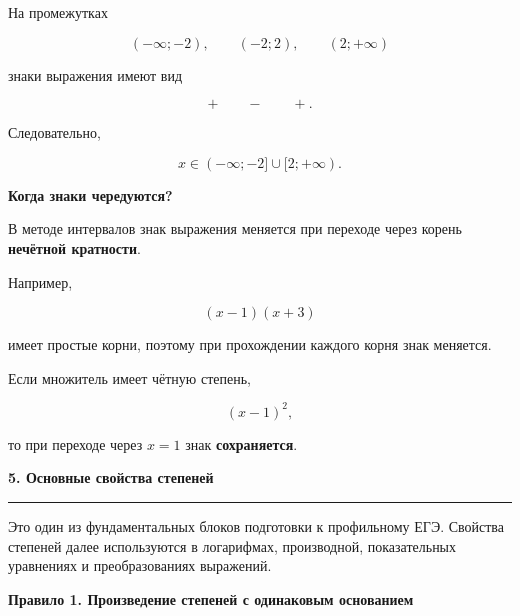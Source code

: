 \documentclass[a4paper,12pt]{article}
\newcommand{\MainSection}[1]{%
  \vspace{0.7em}
  {\Large\bfseries\color{darkaccent}#1\par}
  \vspace{0.25em}
  {\color{accent}\rule{\linewidth}{0.6pt}}
  \vspace{0.5em}
}
\newcommand{\SubSection}[1]{%
  \vspace{0.5em}
  {\large\bfseries\color{accent}#1\par}
  \vspace{0.2em}
}
\newcommand{\important}[1]{\textbf{\color{darkaccent}#1}}
\begin{document}
На промежутках

\[
(-\infty;-2),\qquad
(-2;2),\qquad
(2;+\infty)
\]

знаки выражения имеют вид

\[
+\qquad -\qquad +.
\]

Следовательно,

\[
\boxed{
x\in(-\infty;-2]\cup[2;+\infty)
}.
\]

\begin{center}
\end{center}

\SubSection{Когда знаки чередуются?}

В методе интервалов знак выражения меняется при переходе через корень
\important{нечётной кратности}.

Например,

\[
(x-1)(x+3)
\]

имеет простые корни, поэтому при прохождении каждого корня знак меняется.

Если множитель имеет чётную степень,

\[
(x-1)^2,
\]

то при переходе через \(x=1\) знак \important{сохраняется}.


\MainSection{5. Основные свойства степеней}

Это один из фундаментальных блоков подготовки к профильному ЕГЭ.
Свойства степеней далее используются в логарифмах, производной,
показательных уравнениях и преобразованиях выражений.

\SubSection{Правило 1. Произведение степеней с одинаковым основанием}
\end{document}
